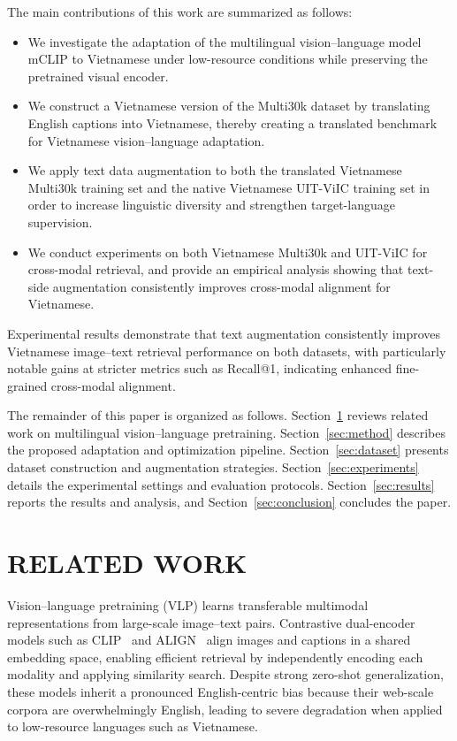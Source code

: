 The main contributions of this work are summarized as follows:

\begin{itemize}
\item We investigate the adaptation of the multilingual vision--language model mCLIP to Vietnamese under low-resource conditions while preserving the pretrained visual encoder.

\item We construct a Vietnamese version of the Multi30k dataset by translating English captions into Vietnamese, thereby creating a translated benchmark for Vietnamese vision--language adaptation.

\item We apply text data augmentation to both the translated Vietnamese Multi30k training set and the native Vietnamese UIT-ViIC training set in order to increase linguistic diversity and strengthen target-language supervision.

\item We conduct experiments on both Vietnamese Multi30k and UIT-ViIC for cross-modal retrieval, and provide an empirical analysis showing that text-side augmentation consistently improves cross-modal alignment for Vietnamese.
\end{itemize}


Experimental results demonstrate that text augmentation consistently improves Vietnamese image--text retrieval performance on both datasets, with particularly notable gains at stricter metrics such as Recall@1, indicating enhanced fine-grained cross-modal alignment.

The remainder of this paper is organized as follows. Section~\ref{sec:related} reviews related work on multilingual vision--language pretraining. Section~\ref{sec:method} describes the proposed adaptation and optimization pipeline. Section~\ref{sec:dataset} presents dataset construction and augmentation strategies. Section~\ref{sec:experiments} details the experimental settings and evaluation protocols. Section~\ref{sec:results} reports the results and analysis, and Section~\ref{sec:conclusion} concludes the paper.



\section{RELATED WORK}
\label{sec:related}

Vision--language pretraining (VLP) learns transferable multimodal representations from large-scale image--text pairs. Contrastive dual-encoder models such as CLIP~\cite{radford2021learningtransferablevisualmodels} and ALIGN~\cite{jia2021scalingvisualvisionlanguagerepresentation} align images and captions in a shared embedding space, enabling efficient retrieval by independently encoding each modality and applying similarity search. Despite strong zero-shot generalization, these models inherit a pronounced English-centric bias because their web-scale corpora are overwhelmingly English, leading to severe degradation when applied to low-resource languages such as Vietnamese.

